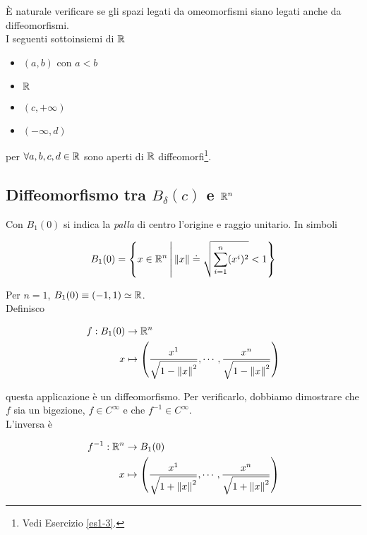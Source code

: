 \`{E} naturale verificare se gli spazi legati da omeomorfismi siano legati anche da diffeomorfismi.\\
I seguenti sottoinsiemi di $ \mathbb{R} $

\begin{itemize}
	\item $ (a,b) $ con $ a < b $
	
	\item $ \mathbb{R} $
	
	\item $ (c, + \infty) $
	
	\item $ (- \infty, d) $
\end{itemize}

per  $ \forall a,b,c,d \in \mathbb{R} $ sono aperti di $ \mathbb{R} $ diffeomorfi\footnote{%
	Vedi Esercizio \ref{es1-3}.%
}.

\subsection{Diffeomorfismo tra $ B_{\delta} (c) $ e $ \mathbb{R}^{n} $}

Con $ B_{1} (0) $ si indica la \textit{palla} di centro l'origine e raggio unitario. In simboli

\begin{equation}
	B_{1} (0) = \left\{ x \in \mathbb{R}^{n} \, \middle| \, \norm{x} \doteq \sqrt{\sum_{i=1}^{n} (x^{i})^{2}} < 1 \right\}
\end{equation}

Per $ n=1 $, $ B_{1} (0) \equiv (-1,1) \simeq \mathbb{R} $.\\
Definisco

\begin{align}
	\begin{split}
		f : B_{1} (0) &\to \mathbb{R}^{n}\\
		x &\mapsto \left( \dfrac{x^{1}}{\sqrt{1 - \norm{x}^{2}}}, \cdots, \dfrac{x^{n}}{\sqrt{1 - \norm{x}^{2}}} \right)
	\end{split}	
\end{align}

questa applicazione è un diffeomorfismo. Per verificarlo, dobbiamo dimostrare che $ f $ sia un bigezione, $ f \in C^{\infty} $ e che $ f^{-1} \in C^{\infty} $.\\
L'inversa è

\begin{align}
	\begin{split}
		f^{-1} : \mathbb{R}^{n} &\to B_{1} (0)\\
		x &\mapsto \left( \dfrac{x^{1}}{\sqrt{1 + \norm{x}^{2}}}, \cdots, \dfrac{x^{n}}{\sqrt{1 + \norm{x}^{2}}} \right)
	\end{split}
\end{align}

